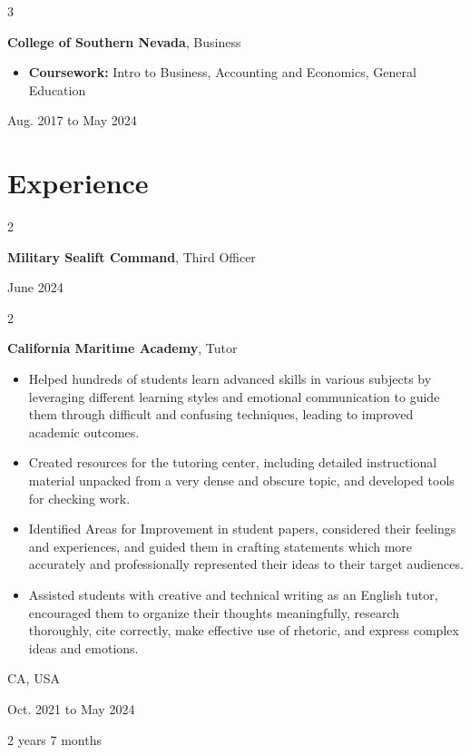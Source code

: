 \documentclass[10pt, letterpaper]{article}
\newenvironment{highlights}{
    \begin{itemize}[
        topsep=0.10 cm,
        parsep=0.10 cm,
        partopsep=0pt,
        itemsep=0pt,
        leftmargin=0.4 cm + 10pt
    ]
}{
    \end{itemize}
} %
\newenvironment{twocolentry}[2][]{
    \onecolentry
    \def\secondColumn{#2}
    \setcolumnwidth{\fill, 4.5 cm}
    \begin{paracol}{2}
}{
    \switchcolumn \raggedleft \secondColumn
    \end{paracol}
    \endonecolentry
} %
\newenvironment{threecolentry}[3][]{
    \onecolentry
    \def\thirdColumn{#3}
    \setcolumnwidth{1 cm, \fill, 4.5 cm}
    \begin{paracol}{3}
    {\raggedright #2} \switchcolumn
}{
    \switchcolumn \raggedleft \thirdColumn
    \end{paracol}
    \endonecolentry
} %
\begin{document}
        \vspace{0.2 cm}

        \begin{threecolentry}{\textbf{}}{
            Aug. 2017 to May 2024
        }
            \textbf{College of Southern Nevada}, Business
            \begin{highlights}
                \item \textbf{Coursework:} Intro to Business, Accounting and Economics, General Education
            \end{highlights}
        \end{threecolentry}


    
    \section{Experience}



        
        \begin{twocolentry}{
            June 2024
        }
            \textbf{Military Sealift Command}, Third Officer
        \end{twocolentry}


        \vspace{0.2 cm}

        \begin{twocolentry}{
            CA, USA

        Oct. 2021 to May 2024

        2 years 7 months
        }
            \textbf{California Maritime Academy}, Tutor
            \begin{highlights}
                \item Helped hundreds of students learn advanced skills in various subjects by leveraging different learning styles and emotional communication to guide them through difficult and confusing techniques, leading to improved academic outcomes.
                \item Created resources for the tutoring center, including detailed instructional material unpacked from a very dense and obscure topic, and developed tools for checking work.
                \item Identified Areas for Improvement in student papers, considered their feelings and experiences, and guided them in crafting statements which more accurately and professionally represented their ideas to their target audiences.
                \item Assisted students with creative and technical writing as an English tutor, encouraged them to organize their thoughts meaningfully, research thoroughly, cite correctly, make effective use of rhetoric, and express complex ideas and emotions.
            \end{highlights}
        \end{twocolentry}
\end{document}
